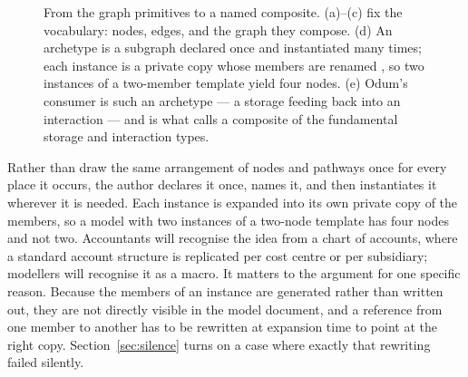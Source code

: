 \documentclass[11pt,a4paper]{article}
\begin{document}
\begin{figure}[h]
\caption{From the graph primitives to a named composite. (a)--(c) fix the
vocabulary: nodes, edges, and the graph they compose. (d) An archetype is a
subgraph declared once and instantiated many times; each instance is a private
copy whose members are renamed , so two
instances of a two-member template yield four nodes. (e) Odum's consumer is such
an archetype --- a storage feeding back into an interaction --- and is what
\citet{odum2000} calls a composite of the fundamental storage and interaction
types.}
\label{fig:archetype}
\end{figure}

Rather than draw the same arrangement of nodes and pathways once for every place it occurs, the author declares it once, names it, and then instantiates it wherever it is needed. Each instance is expanded into its own private copy of the members, so a model with two instances of a two-node template has four nodes and not two. Accountants will recognise the idea from a chart of accounts, where a standard account structure is replicated per cost centre or per subsidiary; modellers will recognise it as a macro. It matters to the argument for one specific reason. Because the members of an instance are generated rather than written out, they are not directly visible in the model document, and a reference from one member to another has to be rewritten at expansion time to point at the right copy. Section~\ref{sec:silence} turns on a case where exactly that rewriting failed silently.
\end{document}
